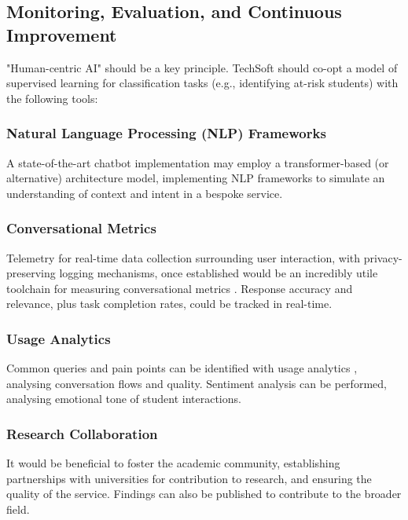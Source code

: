 \documentclass[14pt,a4paper]{article}
\begin{document}
\begin{multicols}{2}
\subsection{Monitoring, Evaluation, and Continuous Improvement}
 "Human-centric AI" should be a key principle.
 TechSoft should co-opt a model of supervised learning for classification tasks (e.g., identifying at-risk students) with the following tools:

\subsubsection{Natural Language Processing (NLP) Frameworks}
A state-of-the-art chatbot implementation may employ a transformer-based (or alternative) architecture model, implementing NLP frameworks \textit{\parencite[pp. 1-15]{JurafskyMartin2024}} to simulate an understanding of context and intent in a bespoke service.

\subsubsection{Conversational Metrics}
Telemetry \textit{\parencite[pp. 30-60]{Vadapalli2024}} for real-time data collection surrounding user interaction, with privacy-preserving logging mechanisms, once established would be an incredibly utile toolchain for measuring conversational metrics \textit{\parencite[pp. 1-32]{Quarteroni2024}}.
Response accuracy and relevance, plus task completion rates, could be tracked in real-time.


\subsubsection{Usage Analytics}
Common queries and pain points can be identified with usage analytics \textit{\parencite[pp. 50-100]{Beasley2024}}, analysing conversation flows and quality.
Sentiment analysis \textit{\parencite[pp. 50-100]{Liu2024}} can be performed, analysing emotional tone of student interactions.

\subsubsection{Research Collaboration}
    It would be beneficial to foster the academic community, establishing partnerships with universities \textit{\parencite[pp. 50-100]{Dillenbourg2024}} for contribution to research, and ensuring the quality of the service.
    Findings can also be published to contribute to the broader field.

\end{multicols}
\end{document}
